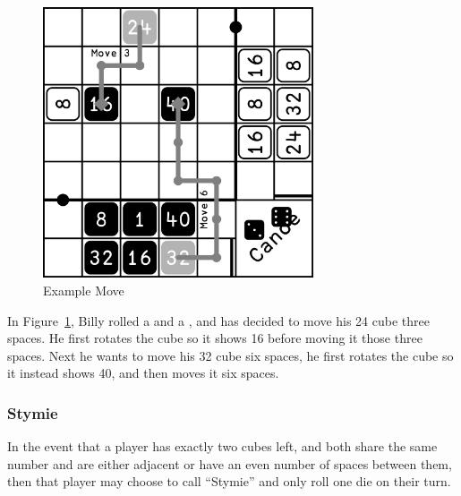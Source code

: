 \begin{figure}[!ht]
    \centering
    \includegraphics[width=8cm]{../graphics/movement}
    \caption{Example Move}
    \label{fig:move}
\end{figure}

\example In Figure~\ref{fig:move}, Billy rolled a  and a , and has decided to move his 24 cube three spaces. 
He first rotates the cube so it shows 16 before moving it those three spaces. 
Next he wants to move his 32 cube six spaces, he first rotates the cube so it instead shows 40, and then moves it six spaces.

\subsubsection{Stymie}
In the event that a player has exactly two cubes left, and both share the same number and are either adjacent or have an even number of spaces between them, then that player may choose to call ``Stymie'' and only roll one die on their turn.